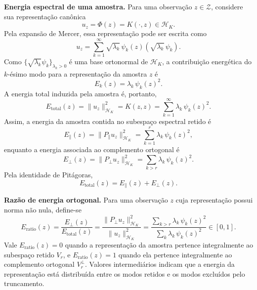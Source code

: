 \textbf{Energia espectral de uma amostra.} Para uma observação $z \in \mathcal{Z}$, considere sua representação canônica
\begin{equation*}
    u_z
    =
    \Phi(z)
    =
    K(\cdot,z)
    \in
    \mathcal{H}_K.
\end{equation*}
Pela expansão de Mercer, essa representação pode ser escrita como
\begin{equation}\label{eq:sample_expansion}
    u_z
    =
    \sum_{k=1}^{\infty}
    \sqrt{\lambda_k}\,\psi_k(z)
    \left(
        \sqrt{\lambda_k}\,\psi_k
    \right).
\end{equation}
Como $\{\sqrt{\lambda_k}\psi_k\}_{\lambda_k>0}$ é uma base ortonormal de $\mathcal{H}_K$, a contribuição energética do $k$-ésimo modo para a representação da amostra $z$ é
\begin{equation}\label{eq:sample_mode_energy}
    E_k(z)
    =
    \lambda_k\,\psi_k(z)^2.
\end{equation}
A energia total induzida pela amostra é, portanto,
\begin{equation}\label{eq:sample_total_energy}
    E_{\mathrm{total}}(z)
    =
    \|u_z\|_{\mathcal{H}_K}^2
    =
    K(z,z)
    =
    \sum_{k=1}^{\infty}
    \lambda_k\,\psi_k(z)^2.
\end{equation}
Assim, a energia da amostra contida no subespaço espectral retido é
\begin{equation}\label{eq:sample_retained_energy}
    E_\parallel(z)
    =
    \|P_\parallel u_z\|_{\mathcal{H}_K}^2
    =
    \sum_{k=1}^{r}
    \lambda_k\,\psi_k(z)^2,
\end{equation}
enquanto a energia associada ao complemento ortogonal é
\begin{equation}\label{eq:sample_orthogonal_energy}
    E_\perp(z)
    =
    \|P_\perp u_z\|_{\mathcal{H}_K}^2
    =
    \sum_{k>r}
    \lambda_k\,\psi_k(z)^2.
\end{equation}
Pela identidade de Pitágoras,
\begin{equation*}
    E_{\mathrm{total}}(z)
    =
    E_\parallel(z)
    +
    E_\perp(z).
\end{equation*}
 
\textbf{Razão de energia ortogonal.} Para uma observação $z$ cuja representação possui norma não nula, define-se
\begin{equation}\label{eq:e_ratio}
    E_{\mathrm{ratio}}(z)
    =
    \frac{
        E_\perp(z)
    }{
        E_{\mathrm{total}}(z)
    }
    =
    \frac{
        \|P_\perp u_z\|_{\mathcal{H}_K}^2
    }{
        \|u_z\|_{\mathcal{H}_K}^2
    }
    =
    \frac{
        \sum_{k>r}
        \lambda_k\,\psi_k(z)^2
    }{
        \sum_k
        \lambda_k\,\psi_k(z)^2
    }
    \in [0,1].
\end{equation}
Vale $E_{\mathrm{ratio}}(z)=0$ quando a representação da amostra pertence integralmente ao subespaço retido $V_r$, e $E_{\mathrm{ratio}}(z)=1$ quando ela pertence integralmente ao complemento ortogonal $V_r^\perp$. Valores intermediários indicam que a energia da representação está distribuída entre os modos retidos e os modos excluídos pelo truncamento.
 
